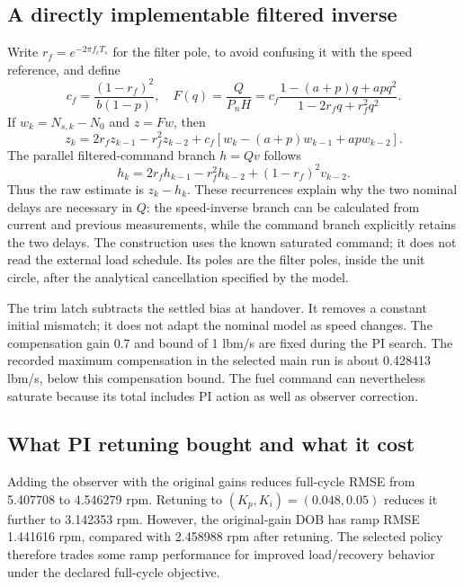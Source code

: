 \subsection{A directly implementable filtered inverse}
Write $r_f=e^{-2\pi f_cT_s}$ for the filter pole, to avoid confusing it with the speed reference, and define
\begin{equation}c_f=\frac{(1-r_f)^2}{b(1-p)},\quad
F(q)=\frac{Q}{P_nH}=c_f\frac{1-(a+p)q+apq^2}{1-2r_fq+r_f^2q^2}.
\end{equation}
If $w_k=N_{s,k}-N_0$ and $z=Fw$, then
\begin{equation}z_k=2r_fz_{k-1}-r_f^2z_{k-2}+c_f[w_k-(a+p)w_{k-1}+apw_{k-2}].
\end{equation}
The parallel filtered-command branch $h=Qv$ follows
\begin{equation}h_k=2r_fh_{k-1}-r_f^2h_{k-2}+(1-r_f)^2v_{k-2}.
\end{equation}
Thus the raw estimate is $z_k-h_k$. These recurrences explain why the two nominal delays are necessary in $Q$: the speed-inverse branch can be calculated from current and previous measurements, while the command branch explicitly retains the two delays. The construction uses the known saturated command; it does not read the external load schedule. Its poles are the filter poles, inside the unit circle, after the analytical cancellation specified by the model.

The trim latch subtracts the settled bias at handover. It removes a constant initial mismatch; it does not adapt the nominal model as speed changes. The compensation gain 0.7 and bound of 1 lbm/s are fixed during the PI search. The recorded maximum compensation in the selected main run is about 0.428413 lbm/s, below this compensation bound. The fuel command can nevertheless saturate because its total includes PI action as well as observer correction.

\subsection{What PI retuning bought and what it cost}
Adding the observer with the original gains reduces full-cycle RMSE from 5.407708 to 4.546279 rpm. Retuning to $(K_p,K_i)=(0.048,0.05)$ reduces it further to 3.142353 rpm. However, the original-gain DOB has ramp RMSE 1.441616 rpm, compared with 2.458988 rpm after retuning. The selected policy therefore trades some ramp performance for improved load/recovery behavior under the declared full-cycle objective.

